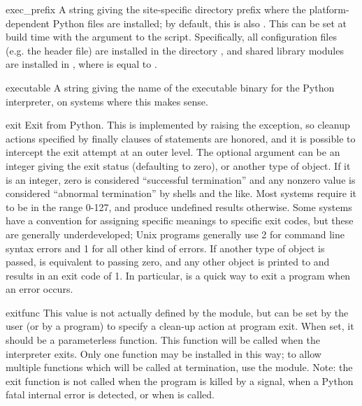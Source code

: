 \begin{datadesc}{exec_prefix}
A string giving the site-specific directory prefix where the
platform-dependent Python files are installed; by default, this is
also .  This can be set at build time with the
 argument to the
 script.  Specifically, all configuration files
(e.g. the  header file) are installed in the directory
, and shared
library modules are installed in , where  is equal
to .
\end{datadesc}

\begin{datadesc}{executable}
A string giving the name of the executable binary for the Python
interpreter, on systems where this makes sense.
\end{datadesc}

\begin{funcdesc}{exit}{}
Exit from Python.  This is implemented by raising the
 exception, so cleanup actions specified by
finally clauses of  statements are honored, and it is
possible to intercept the exit attempt at an outer level.  The
optional argument  can be an integer giving the exit status
(defaulting to zero), or another type of object.  If it is an integer,
zero is considered ``successful termination'' and any nonzero value is
considered ``abnormal termination'' by shells and the like.  Most
systems require it to be in the range 0-127, and produce undefined
results otherwise.  Some systems have a convention for assigning
specific meanings to specific exit codes, but these are generally
underdeveloped; Unix programs generally use 2 for command line syntax
errors and 1 for all other kind of errors.  If another type of object
is passed,  is equivalent to passing zero, and any other
object is printed to  and results in an exit code of
1.  In particular,  is a quick
way to exit a program when an error occurs.
\end{funcdesc}

\begin{datadesc}{exitfunc}
  This value is not actually defined by the module, but can be set by
  the user (or by a program) to specify a clean-up action at program
  exit.  When set, it should be a parameterless function.  This function
  will be called when the interpreter exits.  Only one function may be
  installed in this way; to allow multiple functions which will be called
  at termination, use the  module.  Note: the exit function
  is not called when the program is killed by a signal, when a Python
  fatal internal error is detected, or when  is called.
\end{datadesc}

